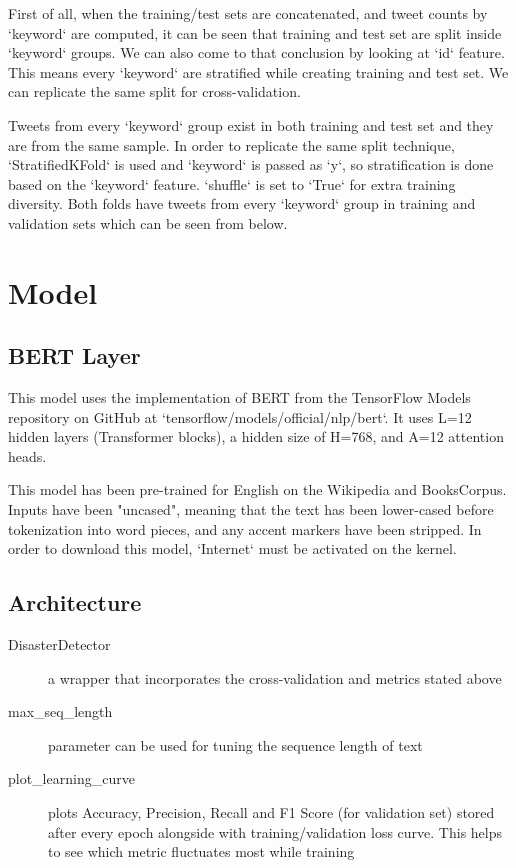 First of all, when the training/test sets are concatenated, 
and tweet counts by `keyword` are computed, it can be seen 
that training and test set are split inside `keyword` groups. 
We can also come to that conclusion by looking at `id` feature. 
This means every `keyword` are stratified while creating 
training and test set. We can replicate the same split for cross-validation.

Tweets from every `keyword` group exist in both training and 
test set and they are from the same sample. In order to replicate 
the same split technique, `StratifiedKFold` is used and `keyword` 
is passed as `y`, so stratification is done based on the `keyword` 
feature. `shuffle` is set to `True` for extra training diversity. 
Both folds have tweets from every `keyword` group in training and 
validation sets which can be seen from below.
	

\section{Model}
\subsection{BERT Layer}
This model uses the implementation of BERT from the TensorFlow Models 
repository on GitHub at `tensorflow/models/official/nlp/bert`. It uses 
L=12 hidden layers (Transformer blocks), a hidden size of H=768, and A=12 attention heads.

This model has been pre-trained for English on 
the Wikipedia and BooksCorpus. Inputs have been "uncased", 
meaning that the text has been lower-cased before tokenization 
into word pieces, and any accent markers have been stripped. In order to 
download this model, `Internet` must be activated on the kernel.

\subsection{Architecture}

\begin{description}
		\item[DisasterDetector] a wrapper that incorporates the cross-validation and metrics stated above
		\item[max\_seq\_length] parameter can be used for tuning the sequence length of text
		\item[plot\_learning\_curve] plots Accuracy, Precision, Recall and F1 Score (for validation set) 
		stored after every epoch alongside with training/validation loss curve. This helps to see which 
		metric fluctuates most while training
\end{description}


